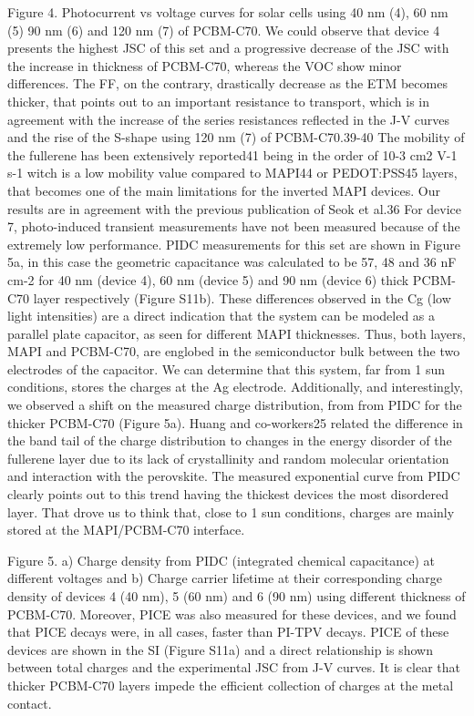 Figure 4. Photocurrent vs voltage curves for solar cells using 40 nm (4), 60 nm (5) 90 nm (6) and 120 nm (7) of PCBM-C70.
We could observe that device 4 presents the highest JSC of this set and a progressive decrease of the JSC with the increase in thickness of PCBM-C70, whereas the VOC show minor differences. The FF, on the contrary, drastically decrease as the ETM becomes thicker, that points out to an important resistance to transport, which is in agreement with the increase of the series resistances reflected in the J-V curves and the rise of the S-shape using 120 nm (7) of PCBM-C70.39-40 The mobility of the fullerene has been extensively reported41 being in the order of 10-3 cm2 V-1 s-1 witch is a low mobility value compared to MAPI44 or PEDOT:PSS45 layers, that becomes one of the main limitations for the inverted MAPI devices. Our results are in agreement with the previous publication of Seok et al.36
For device 7, photo-induced transient measurements have not been measured because of the extremely low performance. PIDC measurements for this set are shown in Figure 5a, in this case the geometric capacitance was calculated to be 57, 48 and 36 nF cm-2 for 40 nm (device 4), 60 nm (device 5) and 90 nm (device 6) thick PCBM-C70 layer respectively (Figure S11b). These differences observed in the Cg (low light intensities) are a direct indication that the system can be modeled as a parallel plate capacitor, as seen for different MAPI thicknesses. Thus, both layers, MAPI and PCBM-C70, are englobed in the semiconductor bulk between the two electrodes of the capacitor. We can determine that this system, far from 1 sun conditions, stores the charges at the Ag electrode. 
Additionally, and interestingly, we observed a shift on the measured charge distribution, from from PIDC for the thicker PCBM-C70 (Figure 5a). Huang and co-workers25 related the difference in the band tail of the charge distribution to changes in the energy disorder of the fullerene layer due to its lack of crystallinity and random molecular orientation and interaction with the perovskite. The measured exponential curve from PIDC clearly points out to this trend having the thickest devices the most disordered layer. That drove us to think that, close to 1 sun conditions, charges are mainly stored at the MAPI/PCBM-C70 interface.


Figure 5. a) Charge density from PIDC (integrated chemical capacitance) at different voltages and b) Charge carrier lifetime at their corresponding charge density of devices 4 (40 nm), 5 (60 nm) and 6 (90 nm) using different thickness of PCBM-C70.
Moreover, PICE was also measured for these devices, and we found that PICE decays were, in all cases, faster than PI-TPV decays. PICE of these devices are shown in the SI (Figure S11a) and a direct relationship is shown between total charges and the experimental JSC from J-V curves. It is clear that thicker PCBM-C70 layers impede the efficient collection of charges at the metal contact.





